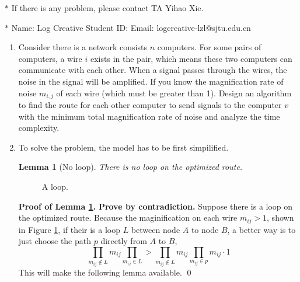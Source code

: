 \documentclass[12pt,a4paper]{article}
\makeatletter
\newtheorem{lemma}[theorem]{Lemma}
\newtheorem*{solution}{Solution}
\theoremstyle{definition}
\renewenvironment{solution}[1][Solution] {\par\pushQED{\qed}\normalfont\topsep6\p@\@plus6\p@\relax\trivlist\item[\hskip\labelsep\bfseries#1\@addpunct{.}]\ignorespaces}{\popQED\endtrivlist\@endpefalse} \makeatother
\makeatother
\begin{document}
\noindent

\noindent{}
\begin{center}
\footnotesize{\color{red}$*$ If there is any problem, please contact TA Yihao Xie. }

\footnotesize{\color{blue}$*$ Name: Log Creative  \quad Student ID:  \quad Email: logcreative-lzl@sjtu.edu.cn}
\end{center}

\begin{enumerate}
    \item  Consider there is a network consists $n$ computers. For some pairs of computers, a wire $i$ exists in the pair, which means these two computers can communicate with each other. When a signal passes through the wires, the noise in the signal will be amplified. If you know the magnification rate of noise $m_{i,j}$ of each wire (which must be greater than 1). Design an algorithm to find the route for each other computer to send signals to the computer $v$ with the minimum total magnification rate of noise and analyze the time complexity.
    
	\begin{solution}
		To solve the problem, the model has to be first simpilified.
		\begin{lemma}[No loop]\label{lem:nl}
			There is no loop on the optimized route.
		\end{lemma}

		\begin{figure}[h]
			\centering
			
			\caption{A loop.}
			\label{fig:lp}
		\end{figure}

		\textbf{Proof of Lemma \ref{lem:nl}.} \textbf{Prove by contradiction.} Suppose there is a loop on the optimized route. Because the maginification on each wire $m_{ij}>1$, shown in Figure \ref{fig:lp}, if their is a loop $L$ between node $A$ to node $B$, a better way is to just choose the path $p$ directly from $A$ to $B$,
		\begin{equation*}
			\prod_{m_{ij}\not\in L} m_{ij} \prod_{m_{ij}\in L} > \prod_{m_{ij}\not\in L} m_{ij} \prod_{m_{ij}\in p} m_{ij} \cdot 1
		\end{equation*}
		This will make the following lemma available.
		\hfil \qed \vspace{\parskip}


\end{solution}
\end{enumerate}
\end{document}
